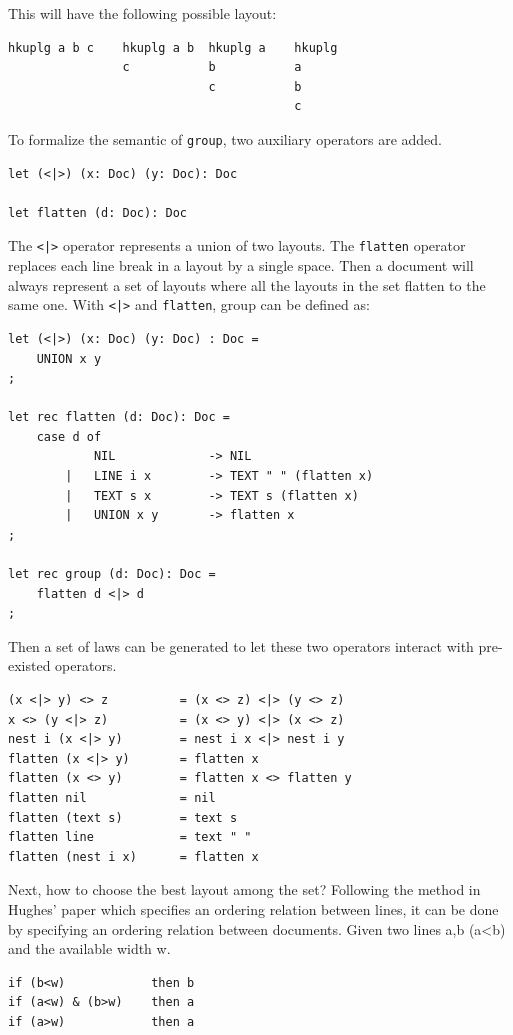 This will have the following possible layout:
\begin{lstlisting}[language=Haskell]
hkuplg a b c    hkuplg a b  hkuplg a    hkuplg
                c           b           a
                            c           b
                                        c
\end{lstlisting}

To formalize the semantic of \texttt{group}, two auxiliary operators are added.
\begin{lstlisting}
let (<|>) (x: Doc) (y: Doc): Doc

let flatten (d: Doc): Doc
\end{lstlisting}

The \texttt{<|>} operator represents a union of two layouts. The \texttt{flatten} operator replaces each line break in a layout by a single space. Then a document will always represent a set of layouts where all the layouts in the set flatten to the same one. With \texttt{<|>} and \texttt{flatten}, group can be defined as:
\begin{lstlisting}
let (<|>) (x: Doc) (y: Doc) : Doc =
    UNION x y
;

let rec flatten (d: Doc): Doc =
    case d of
            NIL             -> NIL
        |   LINE i x        -> TEXT " " (flatten x)
        |   TEXT s x        -> TEXT s (flatten x)
        |   UNION x y       -> flatten x
;

let rec group (d: Doc): Doc =
    flatten d <|> d
;
\end{lstlisting}

Then a set of laws can be generated to let these two operators interact with pre-existed operators.
\begin{lstlisting}
(x <|> y) <> z          = (x <> z) <|> (y <> z)
x <> (y <|> z)          = (x <> y) <|> (x <> z)
nest i (x <|> y)        = nest i x <|> nest i y
flatten (x <|> y)       = flatten x
flatten (x <> y)        = flatten x <> flatten y
flatten nil             = nil
flatten (text s)        = text s
flatten line            = text " "
flatten (nest i x)      = flatten x
\end{lstlisting}

Next, how to choose the best layout among the set? Following the method in Hughes' paper\cite{hughes1995design} which specifies an ordering relation between lines, it can be done by specifying an ordering relation between documents. Given two lines a,b (a<b) and the available width w.
\begin{lstlisting}
if (b<w)            then b
if (a<w) & (b>w)    then a
if (a>w)            then a
\end{lstlisting}

